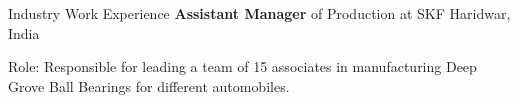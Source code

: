 \begin{rubric}{Industry Work Experience}
\entry*[2011 -- 2012]%
	\textbf{Assistant Manager} of Production at SKF Haridwar, India \par
     {Role}: Responsible for leading a team of 15 associates in manufacturing Deep Grove Ball Bearings for different automobiles.
%
%
%
\end{rubric}